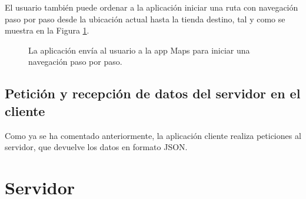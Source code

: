 El usuario también puede ordenar a la aplicación iniciar una ruta con navegación paso por paso desde la ubicación actual hasta la tienda destino, tal y como se muestra en la Figura \ref{fig:mapa-ruta}.

\begin{figure}[H]
	\centering
	\caption{La aplicación envía al usuario a la app Maps para iniciar una navegación paso por paso.}
	\label{fig:mapa-ruta}
\end{figure}

\subsection{Petición y recepción de datos del servidor en el cliente}
Como ya se ha comentado anteriormente, la aplicación cliente realiza peticiones al servidor, que devuelve los datos en formato JSON.

\section{Servidor}

\chapterend